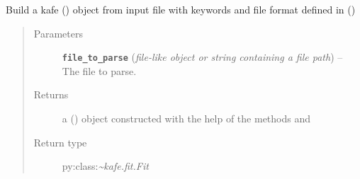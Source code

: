 \documentclass[a4paper,10pt,english]{sphinxmanual}
\begin{document}

\begin{fulllineitems}
\label{module_doc:kafe.file_tools.buildFit_fromFile}
Build a kafe {\hyperref[module_doc:kafe.fit.Fit]{\emph{}}} () object from input file with
keywords and file format defined in
{\hyperref[module_doc:kafe.file_tools.parse_general_inputfile]{\emph{}}} ()
\begin{quote}\begin{description}
\item[{Parameters}] \leavevmode
\textbf{\texttt{file\_to\_parse}} (\emph{file-like object or string containing a file path}) -- The file to parse.

\item[{Returns}] \leavevmode
a {\hyperref[module_doc:kafe.fit.Fit]{\emph{}}} () object
constructed with the help of the methods
 and

\item[{Return type}] \leavevmode
py:class:\emph{\textasciitilde{}kafe.fit.Fit}

\end{description}\end{quote}

\end{fulllineitems}

\end{document}
